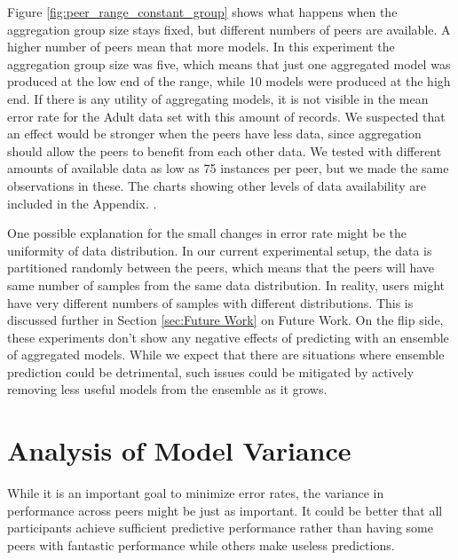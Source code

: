Figure \ref{fig:peer_range_constant_group} shows what happens when the aggregation group size stays fixed, but different numbers of peers are available. A higher number of peers mean that more models. In this experiment the aggregation group size was five, which means that just one aggregated model was produced at the low end of the range, while 10 models were produced at the high end. If there is any utility of aggregating models, it is not visible in the mean error rate for the Adult data set with this amount of records. We suspected that an effect would be stronger when the peers have less data, since aggregation should allow the peers to benefit from each other data. We tested with different amounts of available data as low as 75 instances per peer, but we made the same observations in these. The charts showing other levels of data availability are included in the Appendix.  .

One possible explanation for the small changes in error rate might be the uniformity of data distribution. In our current experimental setup, the data is partitioned randomly between the peers, which means that the peers will have same number of samples from the same data distribution. In reality, users might have very different numbers of samples with different distributions. This is discussed further in Section \ref{sec:Future Work} on Future Work. On the flip side, these experiments don't show any negative effects of predicting with an ensemble of aggregated models. While we expect that there are situations where ensemble prediction could be detrimental, such issues could be mitigated by actively removing less useful models from the ensemble as it grows.

\section{Analysis of Model Variance}

While it is an important goal to minimize error rates, the variance in performance across peers might be just as important. It could be better that all participants achieve sufficient predictive performance rather than having some peers with fantastic performance while others make useless predictions.
 

